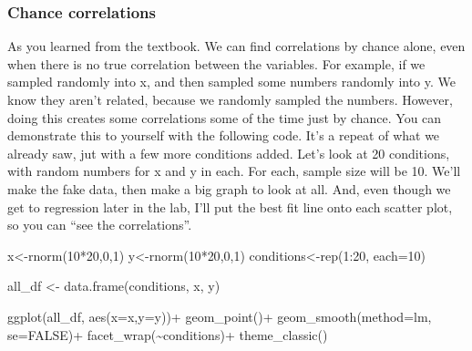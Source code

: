 \documentclass[
]{book}
\newenvironment{Shaded}{\begin{snugshade}}{\end{snugshade}}
\newcommand{\AttributeTok}[1]{\textcolor[rgb]{0.77,0.63,0.00}{#1}}
\newcommand{\ConstantTok}[1]{\textcolor[rgb]{0.00,0.00,0.00}{#1}}
\newcommand{\DecValTok}[1]{\textcolor[rgb]{0.00,0.00,0.81}{#1}}
\newcommand{\FunctionTok}[1]{\textcolor[rgb]{0.00,0.00,0.00}{#1}}
\newcommand{\NormalTok}[1]{#1}
\newcommand{\OtherTok}[1]{\textcolor[rgb]{0.56,0.35,0.01}{#1}}
\newcommand{\SpecialCharTok}[1]{\textcolor[rgb]{0.00,0.00,0.00}{#1}}
\begin{document}
\hypertarget{chance-correlations}{%
\subsubsection{Chance correlations}\label{chance-correlations}}

As you learned from the textbook. We can find correlations by chance alone, even when there is no true correlation between the variables. For example, if we sampled randomly into x, and then sampled some numbers randomly into y. We know they aren't related, because we randomly sampled the numbers. However, doing this creates some correlations some of the time just by chance. You can demonstrate this to yourself with the following code. It's a repeat of what we already saw, jut with a few more conditions added. Let's look at 20 conditions, with random numbers for x and y in each. For each, sample size will be 10. We'll make the fake data, then make a big graph to look at all. And, even though we get to regression later in the lab, I'll put the best fit line onto each scatter plot, so you can ``see the correlations''.

\begin{Shaded}
\begin{Highlighting}[]
\NormalTok{x}\OtherTok{\textless{}{-}}\FunctionTok{rnorm}\NormalTok{(}\DecValTok{10}\SpecialCharTok{*}\DecValTok{20}\NormalTok{,}\DecValTok{0}\NormalTok{,}\DecValTok{1}\NormalTok{)}
\NormalTok{y}\OtherTok{\textless{}{-}}\FunctionTok{rnorm}\NormalTok{(}\DecValTok{10}\SpecialCharTok{*}\DecValTok{20}\NormalTok{,}\DecValTok{0}\NormalTok{,}\DecValTok{1}\NormalTok{)}
\NormalTok{conditions}\OtherTok{\textless{}{-}}\FunctionTok{rep}\NormalTok{(}\DecValTok{1}\SpecialCharTok{:}\DecValTok{20}\NormalTok{, }\AttributeTok{each=}\DecValTok{10}\NormalTok{)}

\NormalTok{all\_df }\OtherTok{\textless{}{-}} \FunctionTok{data.frame}\NormalTok{(conditions, x, y)}

\FunctionTok{ggplot}\NormalTok{(all\_df, }\FunctionTok{aes}\NormalTok{(}\AttributeTok{x=}\NormalTok{x,}\AttributeTok{y=}\NormalTok{y))}\SpecialCharTok{+}
  \FunctionTok{geom\_point}\NormalTok{()}\SpecialCharTok{+}
  \FunctionTok{geom\_smooth}\NormalTok{(}\AttributeTok{method=}\NormalTok{lm, }\AttributeTok{se=}\ConstantTok{FALSE}\NormalTok{)}\SpecialCharTok{+}
  \FunctionTok{facet\_wrap}\NormalTok{(}\SpecialCharTok{\textasciitilde{}}\NormalTok{conditions)}\SpecialCharTok{+}
  \FunctionTok{theme\_classic}\NormalTok{()}
\end{Highlighting}
\end{Shaded}
\end{document}
